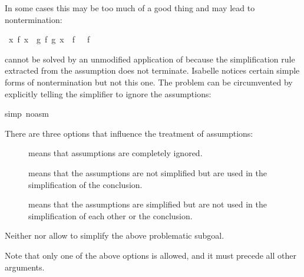 \begin{isabellebody}
\begin{isamarkuptext}
In some cases this may be too much of a good thing and may lead to
nontermination:%
\end{isamarkuptext}%
\ {\isachardoublequote}{\isasymforall}x{\isachardot}\ f\ x\ {\isacharequal}\ g\ {\isacharparenleft}f\ {\isacharparenleft}g\ x{\isacharparenright}{\isacharparenright}\ {\isasymLongrightarrow}\ f\ {\isacharbrackleft}{\isacharbrackright}\ {\isacharequal}\ f\ {\isacharbrackleft}{\isacharbrackright}\ {\isacharat}\ {\isacharbrackleft}{\isacharbrackright}{\isachardoublequote}%
\begin{isamarkuptxt}%
\noindent
cannot be solved by an unmodified application of  because the
simplification rule  extracted from the assumption
does not terminate. Isabelle notices certain simple forms of
nontermination but not this one. The problem can be circumvented by
explicitly telling the simplifier to ignore the assumptions:%
\end{isamarkuptxt}%
simp\ {\isacharparenleft}no{\isacharunderscore}asm{\isacharparenright}{\isacharparenright}%
\begin{isamarkuptext}%
\noindent
There are three options that influence the treatment of assumptions:
\begin{description}
\item[]
 means that assumptions are completely ignored.
\item[]
 means that the assumptions are not simplified but
  are used in the simplification of the conclusion.
\item[]
 means that the assumptions are simplified but are not
  used in the simplification of each other or the conclusion.
\end{description}
Neither  nor  allow to simplify the above
problematic subgoal.

Note that only one of the above options is allowed, and it must precede all
other arguments.%
\end{isamarkuptext}%
\end{isabellebody}%
